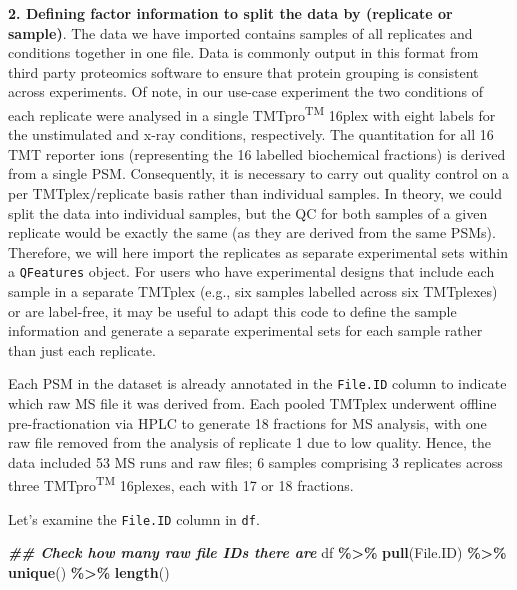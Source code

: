 \documentclass[9pt,a4paper,]{extarticle}
\newenvironment{Shaded}{\begin{snugshade}}{\end{snugshade}}
\newcommand{\DocumentationTok}[1]{\textcolor[rgb]{0.56,0.35,0.01}{\textbf{\textit{#1}}}}
\newcommand{\FunctionTok}[1]{\textcolor[rgb]{0.13,0.29,0.53}{\textbf{#1}}}
\newcommand{\NormalTok}[1]{#1}
\newcommand{\SpecialCharTok}[1]{\textcolor[rgb]{0.81,0.36,0.00}{\textbf{#1}}}
\begin{document}
\textbf{2. Defining factor information to split the data by (replicate or sample)}.
The data we have imported contains samples of all replicates and conditions
together in one file. Data is commonly output in this format from third party
proteomics software to ensure that protein grouping is consistent across
experiments. Of note, in our use-case experiment the two conditions of each
replicate were analysed in a single TMTpro\textsuperscript{TM} 16plex with eight labels for the
unstimulated and x-ray conditions, respectively. The quantitation for all 16 TMT
reporter ions (representing the 16 labelled biochemical fractions) is derived
from a single PSM. Consequently, it is necessary to carry out quality
control on a per TMTplex/replicate basis rather than individual samples. In
theory, we could split the data into individual samples, but the QC for both
samples of a given replicate would be exactly the same (as they are derived from
the same PSMs). Therefore, we will here import the replicates as
separate experimental sets within a \texttt{QFeatures} object. For users who have
experimental designs that include each sample in a separate TMTplex (e.g., six
samples labelled across six TMTplexes) or are label-free, it may be useful to
adapt this code to define the sample information and generate a separate
experimental sets for each sample rather than just each replicate.

Each PSM in the dataset is already annotated in the \texttt{File.ID} column to indicate
which raw MS file it was derived from. Each pooled TMTplex underwent offline
pre-fractionation via HPLC to generate 18 fractions for MS analysis, with one
raw file removed from the analysis of replicate 1 due to low quality. Hence, the
data included 53 MS runs and raw files; 6 samples comprising 3 replicates across
three TMTpro\textsuperscript{TM} 16plexes, each with 17 or 18 fractions.

Let's examine the \texttt{File.ID} column in \texttt{df}.

\begin{Shaded}
\begin{Highlighting}[]
\DocumentationTok{\#\# Check how many raw file IDs there are}
\NormalTok{df }\SpecialCharTok{\%\textgreater{}\%}
  \FunctionTok{pull}\NormalTok{(File.ID) }\SpecialCharTok{\%\textgreater{}\%} 
  \FunctionTok{unique}\NormalTok{() }\SpecialCharTok{\%\textgreater{}\%}
  \FunctionTok{length}\NormalTok{()}
\end{Highlighting}
\end{Shaded}
\end{document}
